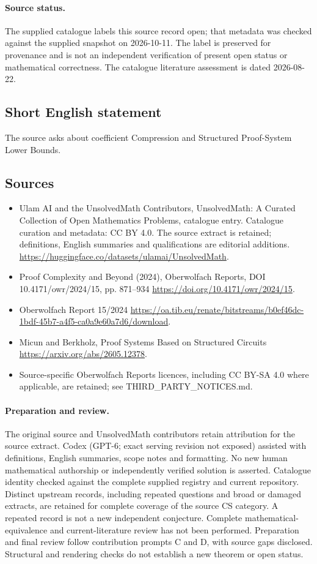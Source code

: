 \documentclass[11pt]{article}
\begin{document}
\paragraph{Source status.}
The supplied catalogue labels this source record open; that metadata was checked against the supplied snapshot on 2026-10-11. The label is preserved for provenance and is not an independent verification of present open status or mathematical correctness. The catalogue literature assessment is dated 2026-08-22.
\subsection{Short English statement}
The source asks about coefficient Compression and Structured Proof-System Lower Bounds.
\subsection{Sources}
\begin{itemize}
\item[\hypertarget{source:statement:1}{S1}] Ulam AI and the UnsolvedMath Contributors, UnsolvedMath: A Curated Collection of Open Mathematics Problems, catalogue entry. Catalogue curation and metadata: CC BY 4.0. The source extract is retained; definitions, English summaries and qualifications are editorial additions.
\url{https://huggingface.co/datasets/ulamai/UnsolvedMath}.
\item[\hypertarget{source:statement:2}{S2}] Proof Complexity and Beyond (2024), Oberwolfach Reports, DOI 10.4171/owr/2024/15, pp. 871--934
\url{https://doi.org/10.4171/owr/2024/15}.
\item[\hypertarget{source:statement:3}{S3}] Oberwolfach Report 15/2024
\url{https://oa.tib.eu/renate/bitstreams/b0ef46dc-1bdf-45b7-a4f5-ca0a9e60a7d6/download}.
\item[\hypertarget{source:statement:4}{S4}] Micun and Berkholz, Proof Systems Based on Structured Circuits
\url{https://arxiv.org/abs/2605.12378}.
\item Source-specific Oberwolfach Reports licences, including CC BY-SA 4.0 where applicable, are retained; see THIRD\_PARTY\_NOTICES.md.
\end{itemize}
\paragraph{Preparation and review.}
The original source and UnsolvedMath contributors retain attribution for the source extract. Codex (GPT-6; exact serving revision not exposed) assisted with definitions, English summaries, scope notes and formatting. No new human mathematical authorship or independently verified solution is asserted. Catalogue identity checked against the complete supplied registry and current repository. Distinct upstream records, including repeated questions and broad or damaged extracts, are retained for complete coverage of the source CS category. A repeated record is not a new independent conjecture. Complete mathematical-equivalence and current-literature review has not been performed. Preparation and final review follow contribution prompts C and D, with source gaps disclosed. Structural and rendering checks do not establish a new theorem or open status.
\label{end:statement}
\end{document}
